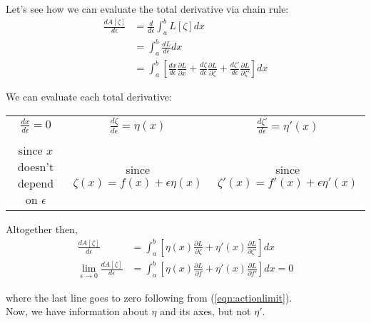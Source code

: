 \documentclass{article}
\newcommand{\DD}[2]{\frac{d #1}{d #2}}
\newcommand{\PD}[2]{\frac{\partial #1}{\partial #2}}
\begin{document}
Let's see how we can evaluate the total derivative via chain rule:
\begin{align}
    \DD{A[\zeta]}{\epsilon}
     & = \DD{}{\epsilon} \int_a^b L [\zeta] dx \\
     & = \int_a^b \DD{L}{\epsilon} dx          \\
     & = \int_a^b \left[
        \DD{x}{\epsilon} \PD{L}{x}
        + \DD{\zeta}{\epsilon} \PD{L}{\zeta}
        + \DD{\zeta'}{\epsilon} \PD{L}{\zeta'}
        \right] dx
\end{align}

We can evaluate each total derivative:

\begin{center}
    \begin{tabular}{ c|c|c }
        $\displaystyle \DD{x}{\epsilon}  = 0$
         & $\displaystyle \DD{\zeta}{\epsilon}  = \eta(x)$
         & $\displaystyle \DD{\zeta'}{\epsilon} = \eta'(x)$   \\
         &                                                  & \\
        since $x$ doesn't depend on $\epsilon$
         & since $\zeta(x) = f(x) + \epsilon \eta(x)$
         & since $\zeta'(x) = f'(x) + \epsilon \eta'(x)$      \\
    \end{tabular}
\end{center}

Altogether then,
\begin{align}
    \DD{A[\zeta]}{\epsilon}
     & = \int_a^b
    \left[
        \eta(x) \PD{L}{\zeta}
        + \eta'(x) \PD{L}{\zeta'}
    \right] dx    \\
    \lim_{\epsilon \to 0}
    \DD{A[\zeta]}{\epsilon}
     & = \int_a^b
    \left[
        \eta(x) \PD{L}{f}
        + \eta'(x) \PD{L}{f'}
        \right] dx
    = 0
\end{align}

\hspace{\parindent} where the last line goes to zero following from (\ref{eqn:actionlimit}).
\\

Now, we have information about $\eta$ and its axes, but not $\eta'$.
\end{document}
